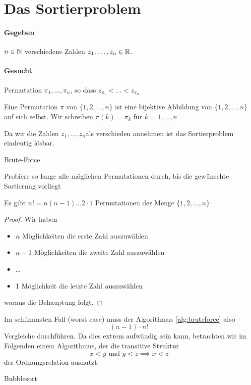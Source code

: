 \section{Das Sortierproblem}
\paragraph{Gegeben} $n \in \mathbb{N}$ verschiedene Zahlen $z_1,\ldots,z_n \in \mathbb{R}$.
\paragraph{Gesucht} Permutation $\pi_1,\ldots,\pi_n$, so dass $z_{\pi_1} < \ldots < z_{\pi_n}$
\begin{definition}[Permutation]
Eine Permutation $\pi$ von $\{1,2,\ldots, n\}$ ist eine bijektive Abbildung von $\{1,2,\ldots,n\} $ auf sich selbst. Wir schreiben $\pi(k)=\pi_k$ für $k=1,\ldots,n$
\end{definition}
\begin{remark}
Da wir die Zahlen $z_1,\ldots,z_n$als verschieden annehmen ist das Sortierproblem eindeutig lösbar.
\end{remark}
\begin{algorithm}
\label{alg:bruteforce}
\caption{Brute-Force}
Probiere so lange alle möglichen Permutationen durch, bis die gewünschte Sortierung vorliegt
\end{algorithm}
\begin{theorem}
Es gibt $n! = n(n-1)\ldots 2 \cdot 1$ Permutationen der Menge $\{1,2,\ldots,n\} $
\end{theorem}
\begin{proof}
Wir haben 
\begin{itemize}
	\item $n$ Möglichkeiten die erste Zahl auszuwählen
	\item $n-1$ Möglichkeiten die zweite Zahl auszuwählen
	\item \ldots
	\item 1 Möglichkeit die letzte Zahl auszuwählen
\end{itemize}
woraus die Behauptung folgt.
\end{proof}
Im schlimmsten Fall (worst case) muss der Algorithmus \ref{alg:bruteforce} also
\[
	(n-1)\cdot n!
\]
Vergleiche durchführen. Da dies extrem aufwändig sein kann, betrachten wir im Folgenden einem Algorithmus, der die transitive Struktur
\[
x<y \text{ und } y<z \implies x<z
\]
der Ordnungsrelation ausnutzt. \\
\begin{algorithm}[H]
\caption{Bubblesort}
\label{alg:bubblesort}
\end{algorithm}
